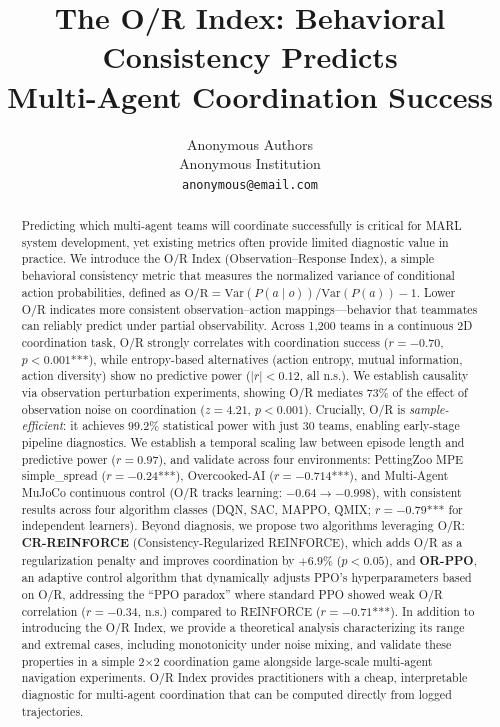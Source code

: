 \documentclass[twoside]{article}
\title{The O/R Index: Behavioral Consistency Predicts \\Multi-Agent Coordination Success}
\author{
  Anonymous Authors\\
  Anonymous Institution\\
  \texttt{anonymous@email.com}
}
\date{}
\newcommand{\ORIndex}{O/R Index}
\theoremstyle{remark}
\begin{document}
\maketitle

\begin{abstract}
Predicting which multi-agent teams will coordinate successfully is critical
for MARL system development, yet existing metrics often provide limited
diagnostic value in practice. We introduce the \ORIndex{} (Observation--Response
Index), a simple behavioral consistency metric that measures the normalized
variance of conditional action probabilities, defined as
$\mathrm{O/R} = \mathrm{Var}(P(a \mid o))/\mathrm{Var}(P(a)) - 1$.
Lower O/R indicates more consistent observation--action mappings—behavior that
teammates can reliably predict under partial observability. Across 1{,}200 teams
in a continuous 2D coordination task, O/R strongly correlates with coordination
success ($r = -0.70$, $p < 0.001$***), while entropy-based alternatives (action
entropy, mutual information, action diversity) show no predictive power ($|r| < 0.12$, all n.s.). We establish causality via observation perturbation experiments, showing O/R mediates 73\% of the effect of observation noise on coordination ($z = 4.21$, $p < 0.001$). Crucially, O/R is \emph{sample-efficient}: it
achieves $99.2\%$ statistical power with just 30 teams, enabling early-stage
pipeline diagnostics. We establish a temporal scaling law between episode length
and predictive power ($r = 0.97$), and validate across four environments: PettingZoo MPE simple\_spread ($r = -0.24$***), Overcooked-AI ($r = -0.714$***), and Multi-Agent MuJoCo continuous control (O/R tracks learning: $-0.64 \to -0.998$), with consistent results across four algorithm classes (DQN, SAC, MAPPO, QMIX; $r = -0.79$*** for independent learners). Beyond diagnosis, we propose two algorithms
leveraging O/R: \textbf{CR-REINFORCE} (Consistency-Regularized REINFORCE), which
adds O/R as a regularization penalty and improves coordination by $+6.9\%$ ($p < 0.05$),
and \textbf{OR-PPO}, an adaptive control algorithm that dynamically adjusts PPO's
hyperparameters based on O/R, addressing the ``PPO paradox'' where standard PPO showed
weak O/R correlation ($r = -0.34$, n.s.) compared to REINFORCE ($r = -0.71$***).
In addition to introducing the O/R Index, we provide a theoretical analysis
characterizing its range and extremal cases, including monotonicity under
noise mixing, and validate these properties in a simple 2$\times$2 coordination
game alongside large-scale multi-agent navigation experiments.
O/R Index provides practitioners with a cheap, interpretable diagnostic for
multi-agent coordination that can be computed directly from logged trajectories.
\end{abstract}
\end{document}
